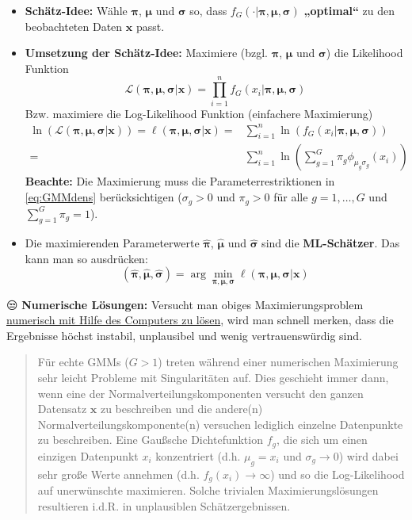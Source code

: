 \documentclass[
  ngerman,
]{book}
\begin{document}
\begin{itemize}
\item
  \textbf{Schätz-Idee:} Wähle \(\boldsymbol{\pi}\), \(\boldsymbol{\mu}\) und \(\boldsymbol{\sigma}\) so, dass \(f_G(\cdot|\boldsymbol{\pi},\boldsymbol{\mu},\boldsymbol{\sigma})\) \textbf{„optimal``} zu den beobachteten Daten \(\mathbf{x}\) passt.
\item
  \textbf{Umsetzung der Schätz-Idee:} Maximiere (bzgl. \(\boldsymbol{\pi}\), \(\boldsymbol{\mu}\) und \(\boldsymbol{\sigma}\)) die Likelihood Funktion
  \[\mathcal{L}(\boldsymbol{\pi},\boldsymbol{\mu},\boldsymbol{\sigma}|\mathbf{x})=\prod_{i=1}^nf_G(x_i|\boldsymbol{\pi},\boldsymbol{\mu},\boldsymbol{\sigma})\]
  Bzw. maximiere die Log-Likelihood Funktion (einfachere Maximierung)
  \begin{align*}
  \ln\left(\mathcal{L}(\boldsymbol{\pi},\boldsymbol{\mu},\boldsymbol{\sigma}|\mathbf{x})\right)=
  \ell(\boldsymbol{\pi},\boldsymbol{\mu},\boldsymbol{\sigma}|\mathbf{x})
  =&\sum_{i=1}^n\ln\left(f_G(x_i|\boldsymbol{\pi},\boldsymbol{\mu},\boldsymbol{\sigma})\right)\\
  =&\sum_{i=1}^n\ln\left(\sum_{g=1}^G\pi_g\phi_{\mu_g\sigma_g}(x_i)\right)
  \end{align*}
  \textbf{Beachte:} Die Maximierung muss die Parameterrestriktionen in \eqref{eq:GMMdens} berücksichtigen (\(\sigma_g>0\) und \(\pi_g>0\) für alle \(g=1,\dots,G\) und \(\sum_{g=1}^G\pi_g=1\)).
\item
  Die maximierenden Parameterwerte {\(\hat{\boldsymbol{\pi}}\)}, {\(\hat{\boldsymbol{\mu}}\)} und {\(\hat{\boldsymbol{\sigma}}\)} sind die {\textbf{ML-Schätzer}}. Das kann man so ausdrücken:
  \[
  (\hat{\boldsymbol{\pi}},\hat{\boldsymbol{\mu}},\hat{\boldsymbol{\sigma}})=\arg\min_{\boldsymbol{\pi},\boldsymbol{\mu},\boldsymbol{\sigma}}\ell(\boldsymbol{\pi},\boldsymbol{\mu},\boldsymbol{\sigma}|\mathbf{x})
  \]
\end{itemize}

😒 \textbf{Numerische Lösungen:} Versucht man obiges Maximierungsproblem \href{https://cran.r-project.org/web/packages/EstimationTools/vignettes/maxlogL.pdf}{numerisch mit Hilfe des Computers zu lösen}, wird man schnell merken, dass die Ergebnisse höchst instabil, unplausibel und wenig vertrauenswürdig sind.

\begin{quote}
Für echte GMMs (\(G>1\)) treten während einer numerischen Maximierung sehr leicht Probleme mit Singularitäten auf. Dies geschieht immer dann, wenn eine der Normalverteilungskomponenten versucht den ganzen Datensatz \(\mathbf{x}\) zu beschreiben und die andere(n) Normalverteilungskomponente(n) versuchen lediglich einzelne Datenpunkte zu beschreiben. Eine Gaußsche Dichtefunktion \(f_g\), die sich um einen einzigen Datenpunkt \(x_i\) konzentriert (d.h. \(\mu_g=x_i\) und \(\sigma_g\to 0\)) wird dabei sehr große Werte annehmen (d.h. \(f_g(x_i)\to\infty\)) und so die Log-Likelihood auf unerwünschte maximieren. Solche trivialen Maximierungslösungen resultieren i.d.R. in unplausiblen Schätzergebnissen.
\end{quote}
\end{document}
